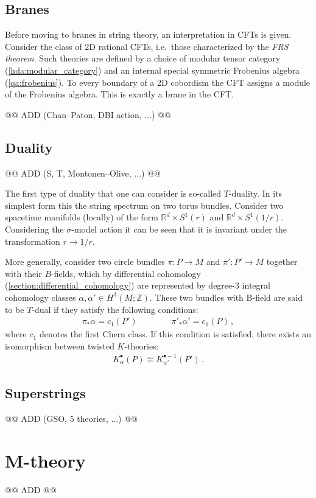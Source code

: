 \subsection{Branes}

    Before moving to branes in string theory, an interpretation in CFTs is given. Consider the class of 2D rational CFTs, i.e.~those characterized by the \textit{FRS theorem}. Such theories are defined by a choice of modular tensor category (\cref{hda:modular_category}) and an internal special symmetric Frobenius algebra (\cref{qa:frobenius}). To every boundary of a 2D cobordism the CFT assigns a module of the Frobenius algebra. This is exactly a brane in the CFT.

    @@ ADD (Chan--Paton, DBI action, ...) @@

\subsection{Duality}

    @@ ADD (S, T, Montonen--Olive, ...) @@

    The first type of duality that one can consider is so-called $T$-duality. In its simplest form this the string spectrum on two torus bundles. Consider two spacetime manifolds (locally) of the form $\mathbb{R}^d\times S^1(r)$ and $\mathbb{R}^d\times S^1(1/r)$. Considering the $\sigma$-model action it can be seen that it is invariant under the transformation $r\longrightarrow 1/r$.

    More generally, consider two circle bundles $\pi:P\rightarrow M$ and $\pi':P'\rightarrow M$ together with their $B$-fields, which by differential cohomology (\cref{section:differential_cohomology}) are represented by degree-3 integral cohomology classes $\alpha,\alpha'\in H^3(M;\mathbb{Z})$. These two bundles with B-field are said to be $T$-dual if they satisfy the following conditions:
    \begin{gather}
        \pi_*\alpha=c_1(P')\qquad\qquad\pi'_*\alpha'=c_1(P)\,,
    \end{gather}
    where $c_1$ denotes the first Chern class. If this condition is satisfied, there exists an isomorphism between twisted $K$-theories:
    \begin{gather}
        K^\bullet_\alpha(P)\cong K^{\bullet-1}_{\alpha'}(P')\,.
    \end{gather}

\subsection{Superstrings}

    @@ ADD (GSO, 5 theories, ...) @@

\section{M-theory}

    @@ ADD @@